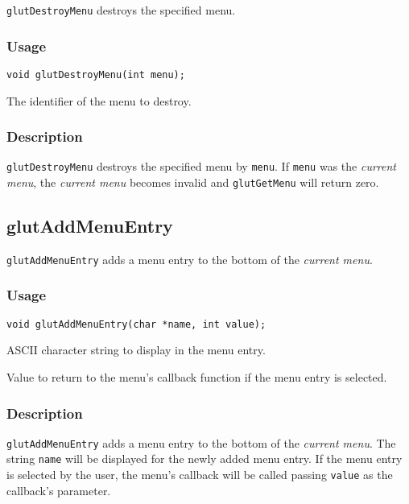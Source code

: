 {\tt glutDestroyMenu} destroys the specified menu.

\subsubsection*{Usage}

\begin{verbatim}
void glutDestroyMenu(int menu);
\end{verbatim}
\begin{description}
\itemsep 0in
\item[\tt menu]
The identifier of the menu to destroy.
\end{description}

\subsubsection*{Description}

{\tt glutDestroyMenu} destroys the specified menu by {\tt menu}.  If {\tt menu}
was the {\em current menu}, the {\em current menu} becomes invalid and
{\tt glutGetMenu} will return zero.

\subsection{glutAddMenuEntry}

{\tt glutAddMenuEntry} adds a menu entry to the bottom of the {\em current menu}.

\subsubsection*{Usage}
\begin{verbatim}
void glutAddMenuEntry(char *name, int value);
\end{verbatim}
\begin{description}
\itemsep 0in
\item[\tt name]
ASCII character string to display in the menu entry.
\item[\tt value]
Value to return to the menu's callback function if the menu entry is selected.
\end{description}

\subsubsection*{Description}

{\tt glutAddMenuEntry} adds a menu entry to the bottom of the {\em current menu}.
The string {\tt name} will be displayed for the newly added menu entry.
If the menu entry is selected by the user, the menu's callback will be called
passing {\tt value} as the callback's parameter.

